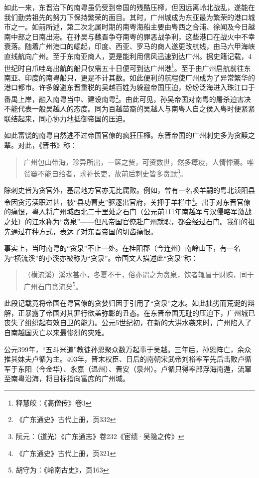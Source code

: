 如此一来，东晋治下的南粤虽仍受到帝国的残酷压榨，但因远离岭北战乱，遂能在我们勤劳祖先的努力下保持繁荣的面目。其时，广州城成为东亚最为繁荣的港口城市之一。如前所述，第二次北属时期的南粤海船主要由粤西之合浦、徐闻及今日越南中部之日南出港。在孙吴与魏晋争夺南粤的罪恶战争利，这些港口在战火中不幸衰落。随着广州港口的崛起，印度、西亚、罗马的商人遂更改航线，由马六甲海峡直线航向广州。至于东南亚商人，更是能利用信风迅速到达广州。据史籍记载，4世纪时自爪哇岛出航的船只仅需五十日便可到达广州港\footnote{释慧皎：《高僧传》卷3 }。至于由广州启航前往东南亚、印度的南粤船只，更是不计其数。如此便利的航程使广州成为了异常繁华的港口都市。许多躲避东晋重税的吴越百姓为躲避帝国压迫，纷纷泛海进入珠江口于番禺上岸，融入南粤当中、建设南粤\footnote{《广东通史》古代上册，页332}。由此可见，孙吴帝国对南粤的屠杀迫害决不能代表一般吴越人的态度。同为百越苗裔的吴越人与南粤人自之侯入粤时便紧紧联结起来，同心协力地抵御帝国的压迫。

如此富饶的南粤自然逃不过帝国官僚的疯狂压榨。东晋帝国的广州刺史多为贪黩之辈。对此，《晋书》称：

\begin{quote}
广州包山带海，珍异所出，一箧之赀，可资数世，然多瘴疫，人情惮焉。唯贫窭不能自给者，求补长吏，故前后刺史皆多贪黩\footnote{阮元：（道光）《广东通志》卷232《宦绩·吴隐之传》}。
\end{quote}

除刺史皆为贪官外，基层地方官亦无比腐败。例如，曾有一名唤羊嗣的粤北浈阳县令因贪污渎职过甚，被“县功曹吏”驱逐出官府，关押于羊栏中\footnote{《广东通史》古代上册，页321}。出于对东晋官僚的痛恨，粤人将广州城西北二十里处之石门（公元前111年南越军与汉侵略军激战之处）的江水称为“贪泉”——但凡帝国官僚赴广州就职，都会经过石门。我们的祖先通过在种方式，表达了对东晋帝国的切齿痛恨。

事实上，当时南粤的“贪泉”不止一处。在桂阳郡（今连州）南岭山下，有一名为“横流溪”的小溪亦被称为“贪泉”。帝国文人描述此“贪泉”称：

\begin{quote}
	（横流溪）溪水甚小，冬夏不干，俗亦谓之为贪泉，饮者辄冒于财贿，同于广州石门贪流矣\footnote{胡守为：《岭南古史》，页163}。
\end{quote}

此段记载竟将帝国在粤官僚的贪婪归因于引用了“贪泉”之水。如此拙劣而荒诞的辩解，正暴露了帝国对其罪行欲盖弥彰的丑态。在东晋帝国无耻的压迫下，广州城已丧失了组织起有效自卫的能力。公元5世纪初，在新的大洪水袭来时，广州陷入了自南越国灭亡以来最惨烈的灾难。

公元399年，“五斗米道”教徒孙恩聚众数万起事于吴越。三年后，孙恩阵亡，余众推其妹夫卢循为主。403年，晋末权臣、日后的南朝宋武帝刘裕率军先后击败卢循军于东阳（今金华）、永嘉（温州）、晋安（泉州）。卢循只得率部浮海南遁，流窜至南粤沿海，将目标指向富庶的广州城。

